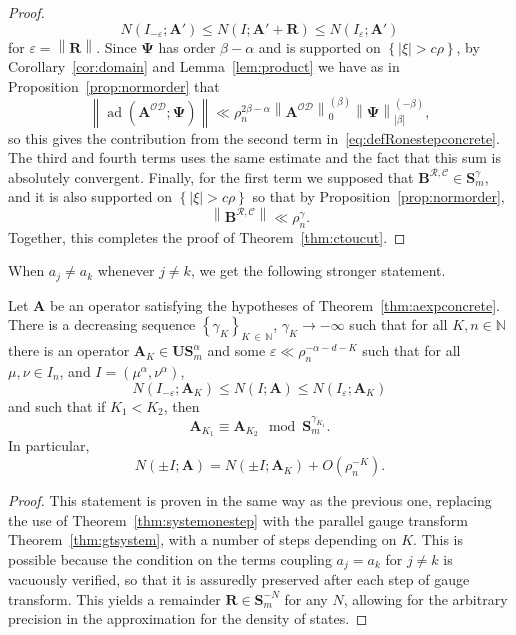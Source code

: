 \documentclass[AHL,Unicode,longabstracts,published]{cedram}
\DeclareMathOperator{\ad}{ad}
\newcommand{\N}{\mathbb N}
\newcommand{\CC}{\mathcal{C}}
\newcommand{\CD}{\mathcal{D}}
\newcommand{\CO}{\mathcal{O}}
\newcommand{\CR}{\mathcal{R}}
\newcommand{\BPsi}{\boldsymbol \Psi}
\newcommand{\BA}{\mathbf A}
\newcommand{\BB}{\mathbf B}
\newcommand{\BS}{\mathbf S}
\newcommand{\BR}{\mathbf R}
\newcommand{\BU}{\mathbf U}
\newcommand{\eps}{\varepsilon}
\newcommand{\bigo}[1]{O\left(#1 \right)}
\newcommand{\abs}[1]{\left\lvert #1 \right\rvert}
\newcommand{\set}[1]{\left\{ #1 \right\}}
\newcommand{\norm}[1]{\left\| #1 \right\|}
\newcommand{\snorm}[3]{\left\| #1\right\|_{#3}^{(#2)}}
\begin{document}
\begin{proof}
\begin{equation}
N(I_{-\eps};\BA') \le N(I;\BA' + \BR) \le N(I_\eps;\BA')
\end{equation}
for $\eps = \norm{\BR}$. Since $\BPsi$ has order $\beta - \alpha$ and is supported on $\set{\abs \xi > c \rho}$, by Corollary~\ref{cor:domain} and Lemma~\ref{lem:product} we have as in Proposition~\ref{prop:normorder} that
\begin{equation}
\norm{\ad\left(\BA^{\CO\CD};\BPsi\right)} \ll \rho_n^{2 \beta - \alpha} \snorm{\BA^{\CO\CD}}{\beta}{0}
\snorm{\BPsi}{-\beta}{\abs{\beta}},
\end{equation}
so this gives the contribution from the second term in~\eqref{eq:defRonestepconcrete}. The third and fourth terms uses the same estimate and the fact that this sum is absolutely convergent. Finally, for the first term we supposed that $\BB^{\CR,\CC} \in \BS_m^{\gamma}$, and it is also supported on $\set{\abs \xi > c \rho}$ so that by Proposition~\ref{prop:normorder},
\begin{equation}
\norm{\BB^{\CR,\CC}} \ll \rho_n^{\gamma}.
\end{equation}
Together, this completes the proof of Theorem~\ref{thm:ctoucut}.
\end{proof}

When $a_j \ne a_k$ whenever $j \ne k$, we get the following stronger statement.
\begin{theo} \label{thm:ctou}
Let $\BA$ be an operator satisfying the hypotheses of Theorem~\ref{thm:aexpconcrete}. There is a decreasing sequence $\set{\gamma_K}_{K\,\in\,\N}$, $\gamma_K \to - \infty$ such that for all $K, n \in \N$ there is an operator $\BA_K \in \BU\BS_m^\alpha$ and some $\eps \ll \rho_n^{-\alpha - d - K}$ such that for all $\mu,\nu \in I_n$, and $I = (\mu^\alpha,\nu^\alpha)$,
\begin{equation}\label{eq:desiredeps}
N(I_{-\eps};\BA_K) \le N(I;\BA) \le N(I_\eps;\BA_K)
\end{equation}
and such that if $K_1 < K_2$, then
\begin{equation}
\BA_{K_1} \equiv \BA_{K_2} \mod \BS^{\gamma_{K_1}}_m.
\end{equation}
In particular,
\begin{equation}\label{eq:approxbydiagonal}
N(\pm I;\BA) = N(\pm I; \BA_K) + \bigo{\rho_n^{-K}}.
\end{equation}
\end{theo}

\begin{proof}
This statement is proven in the same way as the previous one, replacing the use of Theorem~\ref{thm:systemonestep} with the parallel gauge transform Theorem~\ref{thm:gtsystem}, with a number of steps depending on $K$. This is possible because the condition on the terms coupling $a_j=a_k$ for $j
\ne k$ is vacuously verified, so that it is assuredly preserved after each step of gauge transform. This yields a remainder $\BR \in \BS_m^{-N}$ for any $N$, allowing for the arbitrary precision in the approximation for the density of states.
\end{proof}
\end{document}
